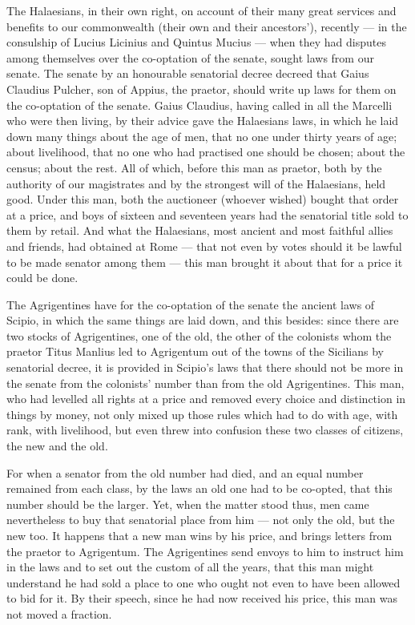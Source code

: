  The Halaesians, in their own right, on account of their many great services and benefits to our commonwealth (their own and their ancestors'), recently --- in the consulship of Lucius Licinius and Quintus Mucius --- when they had disputes among themselves over the co-optation of the senate, sought laws from our senate. The senate by an honourable senatorial decree decreed that Gaius Claudius Pulcher, son of Appius, the praetor, should write up laws for them on the co-optation of the senate. Gaius Claudius, having called in all the Marcelli who were then living, by their advice gave the Halaesians laws, in which he laid down many things about the age of men, that no one under thirty years of age; about livelihood, that no one who had practised one should be chosen; about the census; about the rest. All of which, before this man as praetor, both by the authority of our magistrates and by the strongest will of the Halaesians, held good. Under this man, both the auctioneer (whoever wished) bought that order at a price, and boys of sixteen and seventeen years had the senatorial title sold to them by retail. And what the Halaesians, most ancient and most faithful allies and friends, had obtained at Rome --- that not even by votes should it be lawful to be made senator among them --- this man brought it about that for a price it could be done.

 The Agrigentines have for the co-optation of the senate the ancient laws of Scipio, in which the same things are laid down, and this besides: since there are two stocks of Agrigentines, one of the old, the other of the colonists whom the praetor Titus Manlius led to Agrigentum out of the towns of the Sicilians by senatorial decree, it is provided in Scipio's laws that there should not be more in the senate from the colonists' number than from the old Agrigentines. This man, who had levelled all rights at a price and removed every choice and distinction in things by money, not only mixed up those rules which had to do with age, with rank, with livelihood, but even threw into confusion these two classes of citizens, the new and the old.

 For when a senator from the old number had died, and an equal number remained from each class, by the laws an old one had to be co-opted, that this number should be the larger. Yet, when the matter stood thus, men came nevertheless to buy that senatorial place from him --- not only the old, but the new too. It happens that a new man wins by his price, and brings letters from the praetor to Agrigentum. The Agrigentines send envoys to him to instruct him in the laws and to set out the custom of all the years, that this man might understand he had sold a place to one who ought not even to have been allowed to bid for it. By their speech, since he had now received his price, this man was not moved a fraction.

